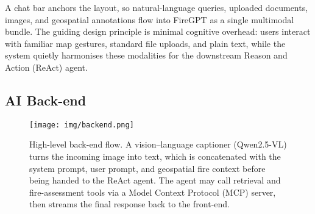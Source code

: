 \documentclass[lang=english,inputenc=utf8,fontsize=10pt]{ldvarticle}
\begin{document}
A chat bar anchors the layout, so natural-language queries, uploaded
documents, images, and geospatial annotations flow into FireGPT as a
single multimodal bundle.  The guiding design principle is minimal
cognitive overhead: users interact with familiar map gestures, standard
file uploads, and plain text, while the system quietly harmonises these
modalities for the downstream Reason and Action (ReAct) agent.

\subsection*{AI Back-end }

\begin{figure}[t]
  \centering
  \texttt{[image: img/backend.png]}
  \caption{High-level back-end flow.  A vision–language captioner
           (Qwen2.5-VL) turns the incoming image into text, which is
           concatenated with the system prompt, user prompt, and
           geospatial fire context before being handed to the ReAct agent.
           The agent may call retrieval and fire-assessment tools via a
           Model Context Protocol (MCP) server, then streams the final
           response back to the front-end.}
  \label{fig:backend}
\end{figure}
\end{document}
